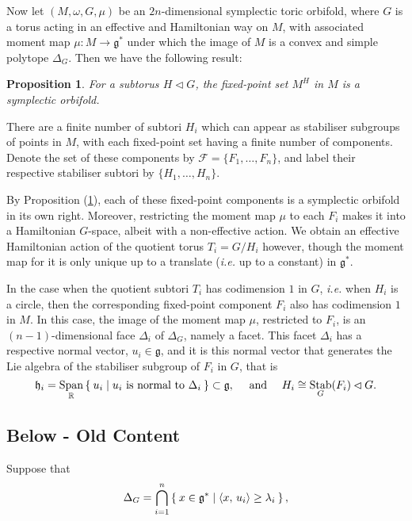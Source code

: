 \documentclass{amsart}
\newtheorem{prop}[theorem]{Proposition}
\newcommand{\ie}{\emph{i.e.} }
\newcommand{\ra}{\rightarrow}
\newcommand{\w}{\omega}
\newcommand{\RR}{\mathbb{R}}
\newcommand{\mcF}{\mathcal{F}}
\newcommand{\mfg}{\mathfrak{g}}
\newcommand{\mfh}{\mathfrak{h}}
\DeclareMathOperator{\Span}{Span}
\DeclareMathOperator{\Stab}{Stab}
\begin{document}
	Now let $(M, \w, G, \mu)$ be an $2n$-dimensional symplectic toric orbifold, where $G$ is a torus acting in an effective and Hamiltonian way on $M$, with associated moment map $\mu : M \ra \mfg^{\ast}$ under which the image of $M$ is a convex and simple polytope $\Delta_{G}$. Then we have the following result:
	
	\begin{prop}\label{thm:fixed-point-suborbifold}
		For a subtorus $H \lhd G$, the fixed-point set $M^{H}$ in $M$ is a symplectic orbifold.
	\end{prop}
	
    There are a finite number of subtori $H_{i}$ which can appear as stabiliser subgroups of points in $M$, with each fixed-point set having a finite number of components. Denote the set of these components by $\mcF = \{F_{1}, \ldots, F_{n} \}$, and label their respective stabiliser subtori by $\{H_{1}, \ldots, H_{n}\}$.
    
    By Proposition (\ref{thm:fixed-point-suborbifold}), each of these fixed-point components is a symplectic orbifold in its own right. Moreover, restricting the moment map $\mu$ to each $F_{i}$ makes it into a Hamiltonian $G$-space, albeit with a non-effective action. We obtain an effective Hamiltonian action of the quotient torus $T_{i} = G/H_{i}$ however, though the moment map for it is only unique up to a translate (\ie up to a constant) in $\mfg^{\ast}$.
    
    In the case when the quotient subtori $T_{i}$ has codimension $1$ in $G$, \ie when $H_{i}$ is a circle, then the corresponding fixed-point component $F_{i}$ also has codimension $1$ in $M$. In this case, the image of the moment map $\mu$, restricted to $F_{i}$, is an $(n-1)$-dimensional face $\Delta_{i}$ of $\Delta_{G}$, namely a facet. This facet $\Delta_{i}$ has a respective normal vector, $u_{i} \in \mfg$, and it is this normal vector that generates the Lie algebra of the stabiliser subgroup of $F_{i}$ in $G$, that is
    \[
    	\mfh_{i} = \Span_{\RR}\Set{u_{i} | u_{i} \text{ is normal to } \Delta_{i}} \subset \mfg, \quad \text{ and } \quad H_{i} \cong \Stab_{G}(F_{i}) \lhd G.
    \]
    
   \subsection{Below - Old Content} 
    
	Suppose that
	\[
		\Delta_{G} = \bigcap_{i=1}^{n} \Set{x \in \mfg^{\ast} | \langle x,\, u_{i} \rangle \geq \lambda_{i} },
	\]
\end{document}

